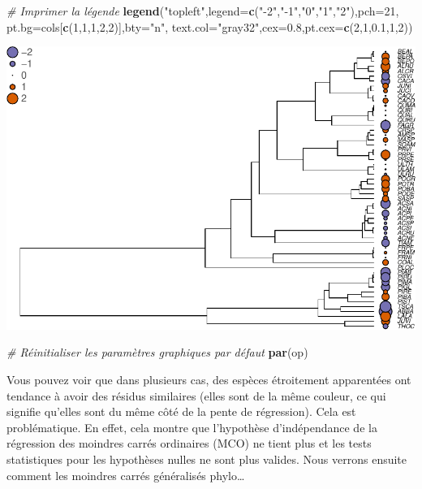 \documentclass[
]{book}
\newenvironment{Shaded}{\begin{snugshade}}{\end{snugshade}}
\newcommand{\AttributeTok}[1]{\textcolor[rgb]{0.13,0.29,0.53}{#1}}
\newcommand{\CommentTok}[1]{\textcolor[rgb]{0.56,0.35,0.01}{\textit{#1}}}
\newcommand{\DecValTok}[1]{\textcolor[rgb]{0.00,0.00,0.81}{#1}}
\newcommand{\FloatTok}[1]{\textcolor[rgb]{0.00,0.00,0.81}{#1}}
\newcommand{\FunctionTok}[1]{\textcolor[rgb]{0.13,0.29,0.53}{\textbf{#1}}}
\newcommand{\NormalTok}[1]{#1}
\newcommand{\StringTok}[1]{\textcolor[rgb]{0.31,0.60,0.02}{#1}}
\begin{document}
\begin{Shaded}
\begin{Highlighting}[]
\CommentTok{\# Imprimer la légende}
\FunctionTok{legend}\NormalTok{(}\StringTok{"topleft"}\NormalTok{,}\AttributeTok{legend=}\FunctionTok{c}\NormalTok{(}\StringTok{"{-}2"}\NormalTok{,}\StringTok{"{-}1"}\NormalTok{,}\StringTok{"0"}\NormalTok{,}\StringTok{"1"}\NormalTok{,}\StringTok{"2"}\NormalTok{),}\AttributeTok{pch=}\DecValTok{21}\NormalTok{,}
       \AttributeTok{pt.bg=}\NormalTok{cols[}\FunctionTok{c}\NormalTok{(}\DecValTok{1}\NormalTok{,}\DecValTok{1}\NormalTok{,}\DecValTok{1}\NormalTok{,}\DecValTok{2}\NormalTok{,}\DecValTok{2}\NormalTok{)],}\AttributeTok{bty=}\StringTok{"n"}\NormalTok{,}
       \AttributeTok{text.col=}\StringTok{"gray32"}\NormalTok{,}\AttributeTok{cex=}\FloatTok{0.8}\NormalTok{,}\AttributeTok{pt.cex=}\FunctionTok{c}\NormalTok{(}\DecValTok{2}\NormalTok{,}\DecValTok{1}\NormalTok{,}\FloatTok{0.1}\NormalTok{,}\DecValTok{1}\NormalTok{,}\DecValTok{2}\NormalTok{))}
\end{Highlighting}
\end{Shaded}

\begin{center}\includegraphics{pcm-workshop_files/figure-latex/Residuals of lm on phylogeny-1} \end{center}

\begin{Shaded}
\begin{Highlighting}[]
\CommentTok{\# Réinitialiser les paramètres graphiques par défaut}
\FunctionTok{par}\NormalTok{(op) }
\end{Highlighting}
\end{Shaded}

Vous pouvez voir que dans plusieurs cas, des espèces étroitement apparentées ont tendance à avoir des résidus similaires (elles sont de la même couleur, ce qui signifie qu'elles sont du même côté de la pente de régression). Cela est problématique. En effet, cela montre que l'hypothèse d'indépendance de la régression des moindres carrés ordinaires (MCO) ne tient plus et les tests statistiques pour les hypothèses nulles ne sont plus valides. Nous verrons ensuite comment les moindres carrés généralisés phylo\ldots{}
\end{document}
